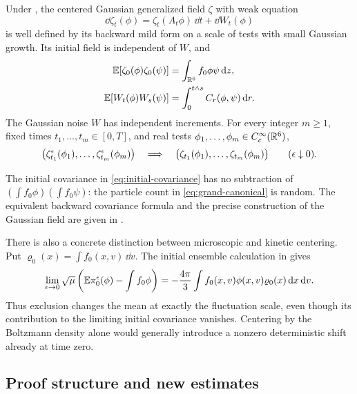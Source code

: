\begin{theorem}\label{thm:main}
Under , the centered Gaussian generalized field
\(\zeta\) with weak equation
\begin{equation}\label{eq:fluctuating-equation}
 \dd\zeta_t(\phi)=\zeta_t(A_t\phi)\,\dd t+\dd W_t(\phi)
\end{equation}
is well defined by its backward mild form on a scale of tests with small
Gaussian growth. Its initial field is independent of \(W\), and
\begin{align}
 \mathbb E[\zeta_0(\phi)\zeta_0(\psi)]
   &=\int_{\mathbb R^6}f_0\phi\psi\,\mathrm d z,\label{eq:initial-covariance}\\
 \mathbb E[W_t(\phi)W_s(\psi)]
   &=\int_0^{t\wedge s}C_r(\phi,\psi)\,\mathrm d r.\label{eq:noise-covariance}
\end{align}
The Gaussian noise \(W\) has independent increments. For every integer
\(m\ge1\), fixed times \(t_1,\ldots,t_m\in[0,T]\), and real tests
\(\phi_1,\ldots,\phi_m\in C_c^\infty(\mathbb R^6)\),
\begin{equation}\label{eq:main-convergence}
 \bigl(\zeta_{t_1}^\epsilon(\phi_1),\ldots,
       \zeta_{t_m}^\epsilon(\phi_m)\bigr)
 \quad\Longrightarrow\quad
 \bigl(\zeta_{t_1}(\phi_1),\ldots,
       \zeta_{t_m}(\phi_m)\bigr)
 \qquad(\epsilon\downarrow0).
\end{equation}
\end{theorem}

The initial covariance in \eqref{eq:initial-covariance} has no subtraction
of \((\int f_0\phi)(\int f_0\psi)\): the particle count in
\eqref{eq:grand-canonical} is random. The equivalent backward covariance
formula and the precise construction of the Gaussian field are given in
.

There is also a concrete distinction between microscopic and kinetic
centering. Put \(\varrho_0(x)=\int f_0(x,v)\,\dd v\).
The initial ensemble calculation in  gives
\[
 \lim_{\epsilon\to0}\sqrt\mu
 \left(\mathbb E\pi_0^\epsilon(\phi)-\int f_0\phi\right)
 =-\frac{4\pi}{3}\int f_0(x,v)\phi(x,v)\varrho_0(x)\,\mathrm d x\,\mathrm d v.
\]
Thus exclusion changes the mean at exactly the fluctuation scale,
even though its contribution to the limiting initial covariance
vanishes. Centering by the Boltzmann density alone would generally
introduce a nonzero deterministic shift already at time zero.

\subsection{Proof structure and new estimates}

